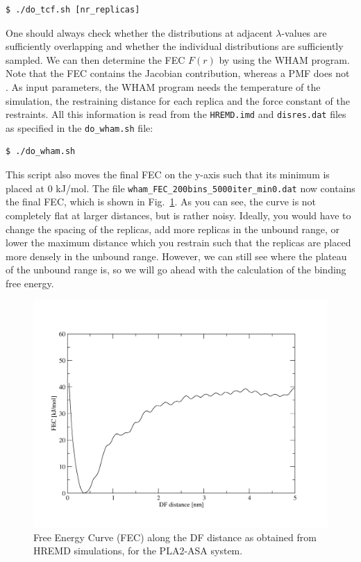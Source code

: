 \begin{lstlisting}
$ ./do_tcf.sh [nr_replicas]
\end{lstlisting}
One should always check whether the distributions at adjacent $\lambda$-values are sufficiently overlapping and whether the individual distributions are sufficiently sampled.
We can then determine the FEC $F(r)$ by using the WHAM program. 
Note that the FEC contains the Jacobian contribution, whereas a PMF does not \cite{Trzesniak_2007}. 
As input parameters, the WHAM program needs the temperature of the simulation, the restraining distance for each replica and the force constant of the restraints. 
All this information is read from the \texttt{HREMD.imd} and \texttt{disres.dat} files as specified in the \texttt{do\_wham.sh} file:
\begin{lstlisting}
$ ./do_wham.sh
\end{lstlisting}
This script also moves the final FEC on the y-axis such that its minimum is placed at 0 kJ/mol.
The file \texttt{wham\_FEC\_200bins\_5000iter\_min0.dat} now contains the final FEC, which is shown in Fig.~\ref{FEC}. As you can see, the curve is not completely flat at larger distances, but is rather noisy. Ideally, you would have to change the spacing of the replicas, add more replicas in the unbound range, or lower the maximum distance which you restrain such that the replicas are placed more densely in the unbound range. 
However, we can still see where the plateau of the unbound range is, so we will go ahead with the calculation of the binding free energy.

\begin{figure}[H]
\centering
\includegraphics[scale=.3]{../06_tutorial_03/figures/FEC}
\caption{Free Energy Curve (FEC) along the DF distance as obtained from HREMD simulations, for the PLA2-ASA system.}
\label{FEC}
\end{figure}

